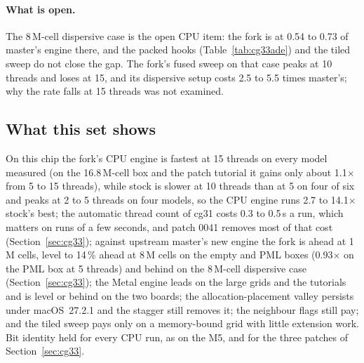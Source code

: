 \paragraph{What is open.} The 8\,M-cell dispersive case is the open CPU item: the fork is at 0.54 to 0.73 of master's
 engine there, and the packed hooks (Table~\ref{tab:cg33ade}) and the tiled sweep do not close the gap. The fork's fused
sweep on that case peaks at 10 threads and loses at 15, and its dispersive setup costs 2.5 to 5.5 times master's; why the rate falls
at 15 threads was not examined.

\subsection*{What this set shows}
On this chip the fork's CPU engine is fastest at 15 threads on every model measured
(on the 16.8\,M-cell box and the patch tutorial it gains only about 1.1$\times$ from 5 to 15 threads), while stock is
slower at 10 threads than at 5 on four of six and peaks at 2 to 5 threads on four models, so the CPU engine runs
2.7 to 14.1$\times$ stock's best; the automatic thread count of cg31 costs 0.3 to 0.5\,s a run, which matters on runs
of a few seconds, and patch 0041 removes most of that cost (Section~\ref{sec:cg33}); against upstream master's new
 engine the fork is ahead at 1\,M cells, level to 14\,\% ahead at 8\,M cells on the empty and PML boxes (0.93$\times$ on the PML box at 5 threads) and
behind on the 8\,M-cell dispersive case (Section~\ref{sec:cg33}); the Metal engine leads on the large grids and the tutorials and is level or
behind on the two boards; the allocation-placement valley persists under macOS~27.2.1 and the stagger still removes it; the neighbour
flags still pay; and the tiled sweep pays only on a memory-bound grid with little extension work. Bit identity held for
every CPU run, as on the M5, and for the three patches of Section~\ref{sec:cg33}.
